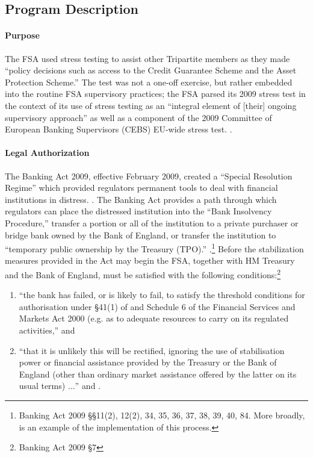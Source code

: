 \documentclass[12pt]{article}
\begin{document}
\subsection{Program Description}

\paragraph{Purpose}

The FSA used stress testing to assist other Tripartite members as they made ``policy decisions such as access to the Credit Guarantee Scheme and the Asset Protection Scheme.'' The test was not a one-off exercise, but rather embedded into the routine FSA supervisory practices; the FSA parsed its 2009 stress test in the context of its use of stress testing as an ``integral element of [their] ongoing supervisory approach'' as well as a component of the 2009 Committee of European Banking Supervisors (CEBS) EU-wide stress test. \citep{Results}.

\paragraph{Legal Authorization}

The Banking Act 2009, effective February 2009, created a ``Special Resolution Regime'' which provided regulators permanent tools to deal with financial institutions in distress. \citep{BankingAct}. The Banking Act provides a path through which regulators can place the distressed institution into the ``Bank Insolvency Procedure,'' transfer a portion or all of the institution to a private purchaser or bridge bank owned by the Bank of England, or transfer the institution to ``temporary public ownership by the Treasury (TPO).'' \citep{ DunfermlinePress}.\footnote{Banking Act 2009 \S \S 11(2), 12(2), 34, 35, 36, 37, 38, 39, 40, 84. More broadly, \citet{Dunfermline} is an example of the implementation of this process. } Before the stabilization measures provided in the Act may begin the FSA, together with HM Treasury and the Bank of England,  must be satisfied with the following conditions:\footnote{Banking Act 2009 \S 7}

\begin{enumerate}
\item ``the bank has failed, or is likely to fail, to satisfy the threshold conditions for authorisation under \S 41(1) of and Schedule 6 of the Financial Services and Markets Act 2000 (e.g. as to adequate resources to carry on its regulated activities,'' and
\item ``that it is unlikely this will be rectified, ignoring the use of stabilisation power or financial assistance provided by the Treasury or the Bank of England (other than ordinary market assistance offered by the latter on its usual terms) $\dots$'' \citep{BankingAct} and \citep{McKnight}.
\end{enumerate}
\end{document}
